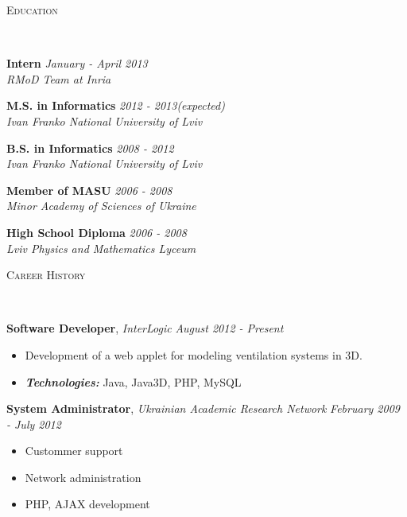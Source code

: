 \documentclass{article}
\newenvironment{changemargin}[2]{%
  \begin{list}{}{%
    \setlength{\topsep}{0pt}%
    \setlength{\leftmargin}{#1}%
    \setlength{\rightmargin}{#2}%
    \setlength{\listparindent}{\parindent}%
    \setlength{\itemindent}{\parindent}%
    \setlength{\parsep}{\parskip}%
  }%
  \item[]}{\end{list}
}
\newcommand{\lineover}{
  \begin{changemargin}{-1mm}{-1mm}
    \vspace*{-8pt}
    \hrulefill \\
    \vspace*{-2pt}
  \end{changemargin}
}
\newcommand{\header}[1]{
  \begin{changemargin}{-12mm}{-12mm}
    \scshape{#1}\\
    \lineover
  \end{changemargin}
}
\newenvironment{body}{
  \vspace*{-16pt}
  \begin{changemargin}{-6mm}{-12mm}
}{
  \end{changemargin}
}
\begin{document}



\header{Education}

\begin{body}
  \vspace{14pt}
  \textbf{Intern} \hfill \emph{January - April 2013} \\
  \emph{RMoD Team at Inria}
  \medskip
  
  \textbf{M.S. in Informatics} \hfill \emph{2012 - 2013(expected)} \\
  \emph{Ivan Franko National University of Lviv}
  \medskip
  
  \textbf{B.S. in Informatics} \hfill \emph{2008 - 2012} \\
  \emph{Ivan Franko National University of Lviv}
  \medskip
  
  \textbf{Member of MASU} \hfill \emph{2006 - 2008} \\
  \emph{Minor Academy of Sciences of Ukraine}
  \medskip
  
  \textbf{High School Diploma} \hfill \emph{2006 - 2008} \\
  \emph{Lviv Physics and Mathematics Lyceum}
\end{body}

\smallskip


\header{Career History}

\begin{body}
  \vspace{14pt}
  \textbf{Software Developer}, \emph{InterLogic} \hfill \emph{August 2012 - Present}\\
  \vspace*{-4pt}
  \begin{itemize} \itemsep -0pt
    \item Development of a web applet for modeling ventilation systems in 3D.
    \item \emph{\textbf{Technologies:}}{} Java, Java3D, PHP, MySQL
  \end{itemize}
  \medskip
  
  \textbf{System Administrator}, \emph{Ukrainian Academic Research Network} \hfill \emph{February 2009 - July 2012}\\
  \vspace*{-4pt}
  \begin{itemize} \itemsep -0pt
    \item Custommer support
    \item Network administration
    \item PHP, AJAX development
  \end{itemize}

\end{body}
\end{document}

